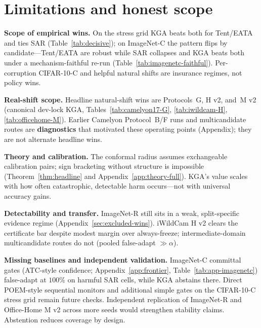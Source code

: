 \documentclass[conference]{IEEEtran}
\theoremstyle{plain}
\theoremstyle{definition}
\theoremstyle{remark}
\begin{document}
\section{Limitations and honest scope}\label{sec:limits}

\medskip
\textbf{Scope of empirical wins.} On the stress grid \textsc{KGA} beats both for Tent/EATA
and ties SAR (Table~\ref{tab:decisive}); on ImageNet-C the pattern flips by candidate---Tent/EATA
are robust while SAR collapses and \textsc{KGA} beats both under a mechanism-faithful re-run
(Table~\ref{tab:imagenetc-faithful}). Per-corruption CIFAR-10-C and helpful natural shifts are
insurance regimes, not policy wins.

\textbf{Real-shift scope.} Headline natural-shift wins are Protocols~G, H v2, and~M v2
(canonical dev-lock \textsc{KGA}, Tables~\ref{tab:camelyon17-G}, \ref{tab:iwildcam-H},
\ref{tab:officehome-M}). Earlier Camelyon Protocol~B/F runs and multicandidate routes are
\textbf{diagnostics} that motivated these operating points (Appendix); they are not alternate headline
wins.

\textbf{Theory and calibration.} The conformal radius assumes exchangeable calibration pairs;
sign bracketing without structure is impossible (Theorem~\ref{thm:headline} and
Appendix~\ref{app:theory-full}). \textsc{KGA}'s value scales with how often catastrophic,
detectable harm occurs---not with universal accuracy gains.

\textbf{Detectability and transfer.} ImageNet-R still sits in a weak, split-specific
evidence regime (Appendix~\ref{sec:excluded-wins}). iWildCam H v2 clears the certificate bar
despite modest margin over always-freeze; intermediate-domain multicandidate routes do not
(pooled false-adapt $\gg\alpha$).

\textbf{Missing baselines and independent validation.} ImageNet-C committal gates
(ATC-style confidence; Appendix~\ref{app:frontier}, Table~\ref{tab:app-imagenetc}) false-adapt at
$100\%$ on harmful SAR cells, while \textsc{KGA} abstains there. Direct POEM-style sequential
monitors and additional simple gates on the CIFAR-10-C stress grid remain future checks.
Independent replication of ImageNet-R and Office-Home M v2 across more seeds would strengthen
stability claims. Abstention reduces coverage by design.

\begin{center}
\end{center}
\end{document}
